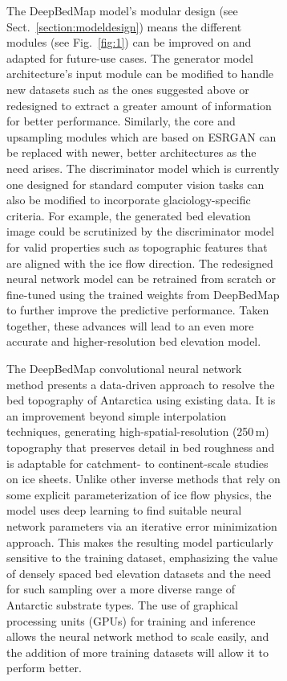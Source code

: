 \documentclass[tc, noline]{copernicus}
\begin{document}
\begin{figure}[t]
\begin{figure}[t]
The DeepBedMap model's modular design (see Sect.~\ref{section:modeldesign}) means the different modules (see Fig.~\ref{fig:1}) can be improved on and adapted for future-use cases.
The generator model architecture's input module can be modified to handle new datasets such as the ones suggested above or redesigned to extract a greater amount of information for better performance.
Similarly, the core and upsampling modules which are based on ESRGAN \citep{WangESRGANEnhancedSuperResolution2019} can be replaced with newer, better architectures as the need arises.
The discriminator model which is currently one designed for standard computer vision tasks can also be modified to incorporate glaciology-specific criteria.
For example, the generated bed elevation image could be scrutinized by the discriminator model for valid properties such as topographic features that are aligned with the ice flow direction.
The redesigned neural network model can be retrained from scratch or fine-tuned using the trained weights from DeepBedMap to further improve the predictive performance.
Taken together, these advances will lead to an even more accurate and higher-resolution bed elevation model.


\conclusions  %

The DeepBedMap convolutional neural network method presents a data-driven approach to resolve the bed topography of Antarctica using existing data.
It is an improvement beyond simple interpolation techniques, generating high-spatial-resolution (250\,\unit{m}) topography that preserves detail in bed roughness and is adaptable for catchment- to continent-scale studies on ice sheets.
Unlike other inverse methods that rely on some explicit parameterization of ice flow physics, the model uses deep learning to find suitable neural network parameters via an iterative error minimization approach.
This makes the resulting model particularly sensitive to the training dataset, emphasizing the value of densely spaced bed elevation datasets and the need for such sampling over a more diverse range of Antarctic substrate types.
The use of graphical processing units (GPUs) for training and inference allows the neural network method to scale easily, and the addition of more training datasets will allow it to perform better.


\end{figure}
\end{figure}
\end{document}
